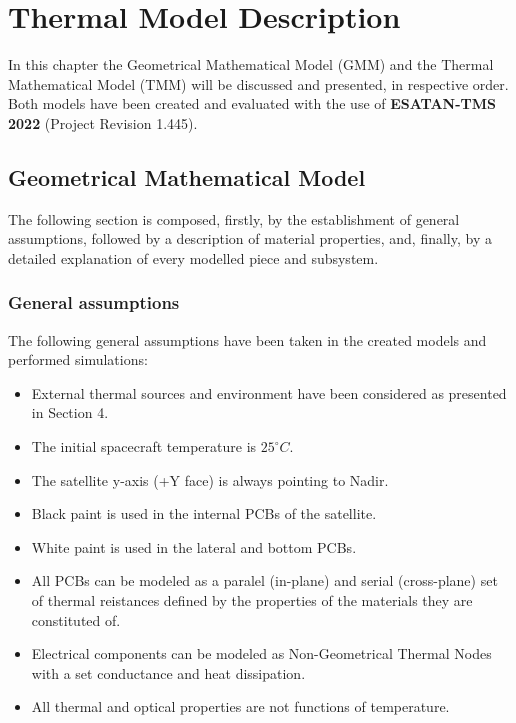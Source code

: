 \section{Thermal Model Description}

In this chapter the Geometrical Mathematical Model (GMM) and the Thermal Mathematical Model
(TMM) will be discussed and presented, in respective order. Both models have been created and
evaluated with the use of \textbf{ESATAN-TMS 2022} (Project Revision 1.445).

\subsection{Geometrical Mathematical Model}

The following section is composed, firstly, by the establishment of general assumptions,
followed by a description of material properties, and, finally, by a detailed explanation
of every modelled piece and subsystem.

\subsubsection{General assumptions}
The following general assumptions have been taken in the created models and performed simulations:

\begin{itemize}
    \item External thermal sources and environment have been considered as presented in Section 4.
    \item The initial spacecraft temperature is $25^\circ C$.
    \item The satellite y-axis (+Y face) is always pointing to Nadir.
    \item Black paint is used in the internal PCBs of the satellite.
    \item White paint is used in the lateral and bottom PCBs.
    \item All PCBs can be modeled as a paralel (in-plane) and serial (cross-plane) set of thermal reistances
    defined by the properties of the materials they are constituted of.
    \item Electrical components can be modeled as Non-Geometrical Thermal Nodes with a set conductance and
    heat dissipation.
    \item All thermal and optical properties are not functions of temperature.
\end{itemize}

